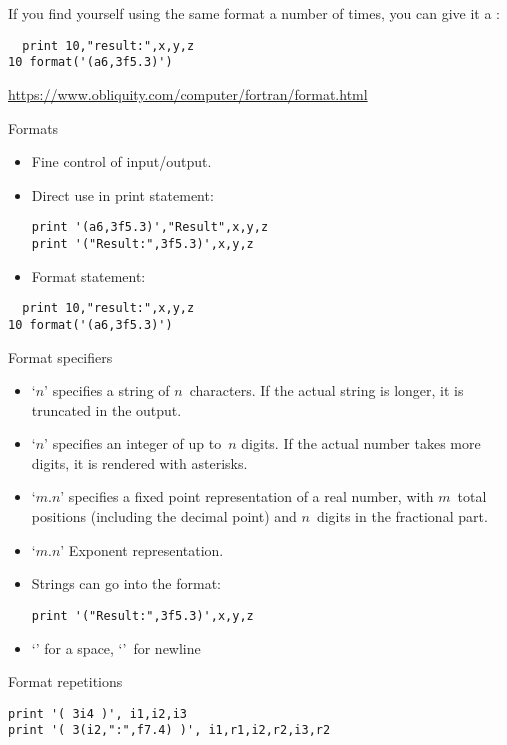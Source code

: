 If you find yourself using the same format a number of times, you can
give it a :
\begin{lstlisting}
  print 10,"result:",x,y,z
10 format('(a6,3f5.3)')
\end{lstlisting}

\url{https://www.obliquity.com/computer/fortran/format.html}

\begin{slide}{Formats}
  \label{sl:formats}
  \begin{itemize}
  \item
    Fine control of input/output.
  \item
    Direct use in print statement:  
\begin{lstlisting}
print '(a6,3f5.3)',"Result",x,y,z
print '("Result:",3f5.3)',x,y,z
\end{lstlisting}
\item Format statement:
  \end{itemize}
\begin{lstlisting}
  print 10,"result:",x,y,z
10 format('(a6,3f5.3)')
\end{lstlisting}
\end{slide}

\begin{slide}{Format specifiers}
  \label{sl:formatspec}
  \begin{itemize}
  \item `$n$' specifies a string of $n$~characters. If the actual
    string is longer, it is truncated in the output.
  \item `$n$' specifies an integer of up to~$n$ digits. If the actual
    number takes more digits, it is rendered with asterisks.
  \item `$m.n$' specifies a fixed point representation of a real
    number, with $m$~total positions (including the decimal point)
    and $n$~digits in the fractional part.
  \item `$m.n$' Exponent representation.
  \item Strings can go into the format:
\begin{lstlisting}
print '("Result:",3f5.3)',x,y,z
\end{lstlisting}
\item `' for a space, `\n{/}'~for newline
  \end{itemize}
\end{slide}

\begin{block}{Format repetitions}
  \label{sl:fformat-rep}
\begin{lstlisting}
print '( 3i4 )', i1,i2,i3
print '( 3(i2,":",f7.4) )', i1,r1,i2,r2,i3,r2
\end{lstlisting}
\end{block}

